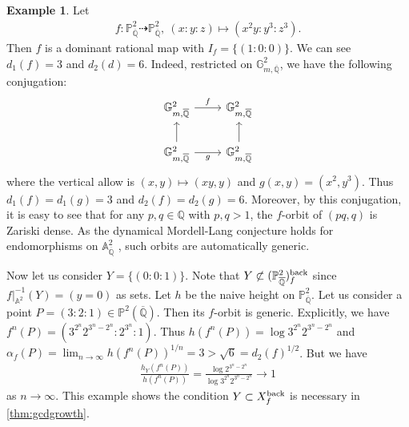 \documentclass[12pt]{amsart}
\theoremstyle{plain}
\theoremstyle{definition}
\newtheorem{example}[theorem]{Example}
\numberwithin{equation}{section}
\def\Q{{\mathbb Q}}
\def\P{{\mathbb P}}
\def\A{{\mathbb A}}
\def\QQ{\overline{\mathbb Q}}
\begin{document}
\begin{example}\label{ex:backnonfinCE}
Let
\begin{align}
f \colon \P^{2}_{\QQ} \dashrightarrow \P^{2}_{\QQ},\ (x:y:z) \mapsto (x^{2}y : y^{3} : z^{3}).
\end{align}
Then $f$ is a dominant rational map with $I_{f}=\{(1:0:0)\}$.
We can see $d_{1}(f) = 3$ and $d_{2}(d) = 6$.
Indeed, restricted on $ {\mathbb{G}}_{m,\QQ}^{2}$, we have the following conjugation:
\begin{equation}
\begin{tikzcd}
 {\mathbb{G}}_{m,\QQ}^{2} \arrow[r, "f"] &  {\mathbb{G}}_{m,\QQ}^{2} \\
  {\mathbb{G}}_{m,\QQ}^{2} \arrow[u] \arrow[r, "g",swap]&  {\mathbb{G}}_{m,\QQ}^{2} \arrow[u]
\end{tikzcd}
\end{equation}
where the vertical allow is $(x,y) \mapsto (xy,y)$ and $g(x,y) = (x^{2},y^{3})$.
Thus $d_{1}(f) = d_{1}(g)=3 $ and $d_{2}(f) = d_{2}(g) = 6$.
Moreover, by this conjugation, it is easy to see that for any $p,q \in \Q$ with $p,q > 1$,
the $f$-orbit of $(pq,q)$ is Zariski dense.
As the dynamical Mordell-Lang conjecture holds for endomorphisms on $\A^{2}_{\QQ}$ \cite{Xi17},
such orbits are automatically generic.

Now let us consider $Y = \{(0:0:1)\}$.
Note that $Y \not\subset (\P^{2}_{\QQ})_{f}^{\rm back}$ since $f|_{\A^{2}}^{-1}(Y) = (y=0)$ as sets.
Let $h$ be the naive height on $\P^{2}_{\QQ}$.
Let us consider a point $P = (3:2:1) \in \P^{2}(\QQ)$.
Then its $f$-orbit is generic.
Explicitly, we have $f^{n}(P) = (3^{2^{n}}2^{3^{n}-2^{n}} : 2^{3^{n}} : 1)$.
Thus
$h(f^{n}(P)) = \log 3^{2^{n}}2^{3^{n}-2^{n}} $ and $ \alpha_{f}(P) = \lim_{n \to \infty} h(f^{n}(P))^{1/n} = 3 > \sqrt{6} = d_{2}(f)^{1/2}$.
But we have
\begin{align}
\frac{h_{Y}(f^{n}(P))}{h(f^{n}(P))} = \frac{\log 2^{3^{n}-2^{n}}}{\log 3^{2^{n}}2^{3^{n}-2^{n}} } \longrightarrow 1
\end{align}
as $n \to \infty$.
This example shows 
the condition $Y \subset X_{f}^{\rm back}$
is necessary in \cref{thm:gcdgrowth}.
\end{example}
\end{document}
